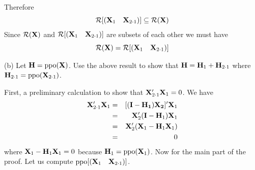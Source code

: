 Therefore
$$
{\cal R}[(\begin{matrix}{\bf X}_1&{\bf X}_{2\cdot1}\end{matrix})]
\subseteq
{\cal R}({\bf X})
$$
Since ${\cal R}({\bf X})$ and
${\cal R}[(\begin{matrix}{\bf X}_1&{\bf X}_{2\cdot1}\end{matrix})]$
are subsets of each other we must have
$${\cal R}({\bf X})={\cal R}[(\begin{matrix}{\bf X}_1&{\bf X}_{2\cdot1}
\end{matrix})]$$

\bigskip
\noindent
(b) Let ${\bf H}=\mathop{\rm ppo}({\bf X})$.
Use the above result to show that
${\bf H}={\bf H}_1+{\bf H}_{2\cdot1}$
where ${\bf H}_{2\cdot1}=\mathop{\rm ppo}({\bf X}_{2\cdot1})$.

\bigskip
\noindent
First, a preliminary calculation to show that
${\bf X}_{2\cdot1}'{\bf X}_1=0$. We have
\begin{eqnarray*}
{\bf X}_{2\cdot1}'{\bf X}_1
&=&[({\bf I}-{\bf H_1}){\bf X_2}]'{\bf X}_1\\
&=&{\bf X}_2'({\bf I}-{\bf H}_1){\bf X}_1\\
&=&{\bf X}_2'({\bf X}_1-{\bf H}_1{\bf X}_1)\\
&=&0
\end{eqnarray*}
where ${\bf X}_1-{\bf H}_1{\bf X}_1=0$ because
$\mathbf H_1=\mathop{\rm ppo}(\mathbf X_1)$.
%
Now for the main part of the proof.
Let us compute
$\mathop{\rm ppo}[(\begin{matrix}{\bf X}_1&{\bf X}_{2\cdot1}
\end{matrix})]$.
